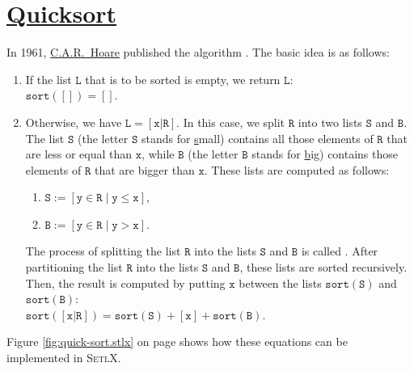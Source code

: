 \section{\href{http://en.wikipedia.org/wiki/Quicksort}{Quicksort}}
In 1961, \href{http://en.wikipedia.org/wiki/Tony_Hoare}{C.A.R.~Hoare} published the
algorithm \cite{hoare:61}.  The basic idea is as follows:
\begin{enumerate}
\item If the list $\mathtt{L}$ that is to be sorted is empty, we return $\mathtt{L}$: 
      \\[0.2cm]
      \hspace*{1.3cm} $\mathtt{sort}([]) = []$.
\item Otherwise, we have $\mathtt{L} = [\mathtt{x}|\mathtt{R}]$.  In this case, we split $\mathtt{R}$ into two lists $\mathtt{S}$ and $\mathtt{B}$.
      The list $\mathtt{S}$ (the letter $\mathtt{S}$ stands for \underline{s}mall) contains all those elements of $\mathtt{R}$ that are less
      or equal than $\mathtt{x}$,     while $\mathtt{B}$ (the letter $\mathtt{B}$ stands for \underline{b}ig) contains
      those elements of $\mathtt{R}$ that are bigger than $\mathtt{x}$.  These lists are computed as follows:
      \begin{enumerate}
      \item $\mathtt{S} := [\mathtt{y} \in \mathtt{R} \mid \mathtt{y} \leq \mathtt{x}]$,
      \item $\mathtt{B} := [\mathtt{y} \in \mathtt{R} \mid \mathtt{y} > \mathtt{x}]$.
      \end{enumerate}
      The process of splitting the list $\mathtt{R}$ into the lists $\mathtt{S}$ and $\mathtt{B}$
      is called .  After partitioning the list $\mathtt{R}$ into the lists $\mathtt{S}$ and $\mathtt{B}$, these lists are sorted
      recursively.  Then, the result is computed by putting $\mathtt{x}$ between the lists $\mathtt{sort}(\mathtt{S})$ and $\mathtt{sort}(\mathtt{B})$:
      \\[0.2cm]
      \hspace*{1.3cm}
      $\mathtt{sort}([\mathtt{x}|\mathtt{R}]) = \mathtt{sort}(\mathtt{S}) + [\mathtt{x}] + \mathtt{sort}(\mathtt{B})$.
\end{enumerate}
Figure \ref{fig:quick-sort.stlx} on page \pageref{fig:quick-sort.stlx} shows how these equations can
be implemented in \textsc{SetlX}.

